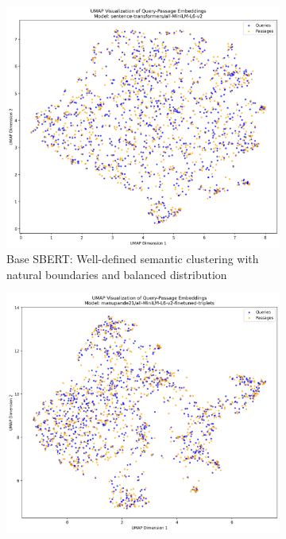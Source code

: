 \documentclass[conference]{IEEEtran}
\begin{document}
\begin{figure}[t]
\centering
\begin{subfigure}{0.32\textwidth}
\includegraphics[width=\textwidth]{umap_visualization_sentence_transformers_all_MiniLM_L6_v2.png}
\caption{Base SBERT: Well-defined semantic clustering with natural boundaries and balanced distribution}
\label{fig:umap_base}
\end{subfigure}
\hfill
\begin{subfigure}{0.32\textwidth}
\includegraphics[width=\textwidth]{umap_visualization_manupande21_all_MiniLM_L6_v2_finetuned_triplets.png}

\end{subfigure}
\end{figure}
\end{document}
